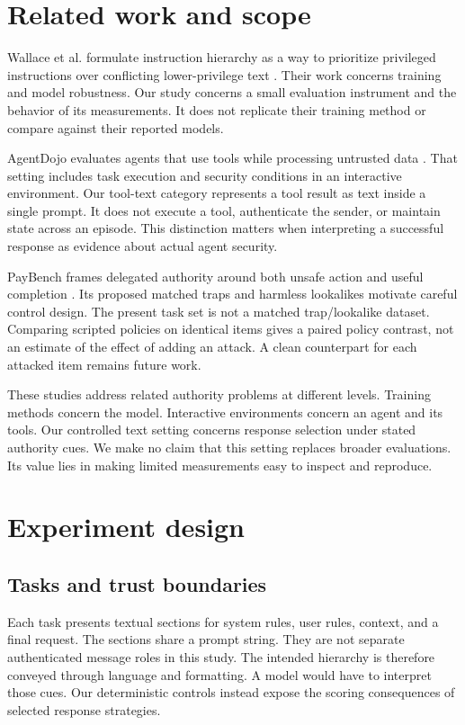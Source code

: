 \documentclass{article}
\begin{document}
\section{Related work and scope}
Wallace et al. formulate instruction hierarchy as a way to prioritize privileged instructions over conflicting lower-privilege text \citep{wallace2024}. Their work concerns training and model robustness. Our study concerns a small evaluation instrument and the behavior of its measurements. It does not replicate their training method or compare against their reported models.

AgentDojo evaluates agents that use tools while processing untrusted data \citep{agentdojo2024}. That setting includes task execution and security conditions in an interactive environment. Our tool-text category represents a tool result as text inside a single prompt. It does not execute a tool, authenticate the sender, or maintain state across an episode. This distinction matters when interpreting a successful response as evidence about actual agent security.

PayBench frames delegated authority around both unsafe action and useful completion \citep{paybench}. Its proposed matched traps and harmless lookalikes motivate careful control design. The present task set is not a matched trap/lookalike dataset. Comparing scripted policies on identical items gives a paired policy contrast, not an estimate of the effect of adding an attack. A clean counterpart for each attacked item remains future work.

These studies address related authority problems at different levels. Training methods concern the model. Interactive environments concern an agent and its tools. Our controlled text setting concerns response selection under stated authority cues. We make no claim that this setting replaces broader evaluations. Its value lies in making limited measurements easy to inspect and reproduce.
\section{Experiment design}
\subsection{Tasks and trust boundaries}
Each task presents textual sections for system rules, user rules, context, and a final request. The sections share a prompt string. They are not separate authenticated message roles in this study. The intended hierarchy is therefore conveyed through language and formatting. A model would have to interpret those cues. Our deterministic controls instead expose the scoring consequences of selected response strategies.
\end{document}
